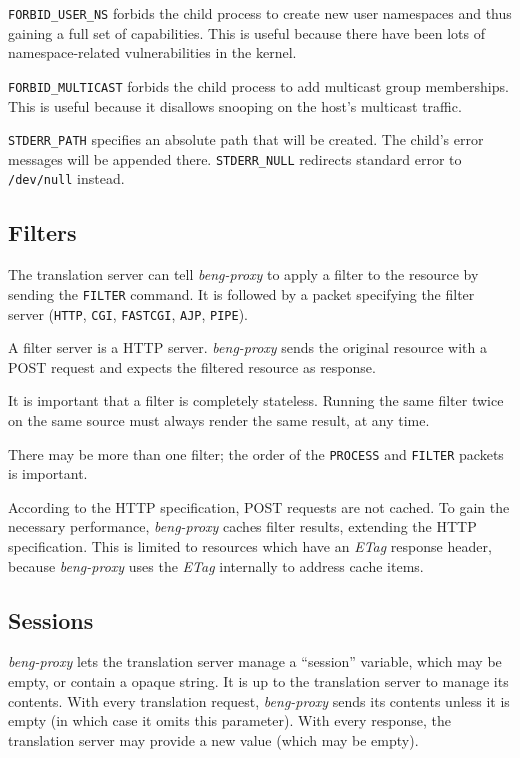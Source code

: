 \documentclass[a4paper,12pt]{article}
\begin{document}
\verb|FORBID_USER_NS| forbids the child process to create new user
namespaces and thus gaining a full set of capabilities.  This is
useful because there have been lots of namespace-related
vulnerabilities in the kernel.

\verb|FORBID_MULTICAST| forbids the child process to add multicast
group memberships.  This is useful because it disallows snooping on
the host's multicast traffic.

\verb|STDERR_PATH| specifies an absolute path that will be created.
The child's error messages will be appended there.  \verb|STDERR_NULL|
redirects standard error to \texttt{/dev/null} instead.

\subsection{Filters}
\label{filter}

The translation server can tell \emph{beng-proxy} to apply a filter to
the resource by sending the \verb|FILTER| command.  It is followed
by a packet specifying the filter server (\verb|HTTP|,
\verb|CGI|, \verb|FASTCGI|, \verb|AJP|, \verb|PIPE|).

A filter server is a HTTP server.  \emph{beng-proxy} sends the
original resource with a POST request and expects the filtered
resource as response.

It is important that a filter is completely stateless.  Running the
same filter twice on the same source must always render the same
result, at any time.

There may be more than one filter; the order of the \verb|PROCESS|
and \verb|FILTER| packets is important.

According to the HTTP specification, POST requests are not cached.  To
gain the necessary performance, \emph{beng-proxy} caches filter
results, extending the HTTP specification.  This is limited to
resources which have an \emph{ETag} response header, because
\emph{beng-proxy} uses the \emph{ETag} internally to address cache
items.

\subsection{Sessions}
\label{sessions}

\emph{beng-proxy} lets the translation server manage a ``session''
variable, which may be empty, or contain a opaque string.  It is up to
the translation server to manage its contents.  With every translation
request, \emph{beng-proxy} sends its contents unless it is empty (in
which case it omits this parameter).  With every response, the
translation server may provide a new value (which may be empty).
\end{document}
